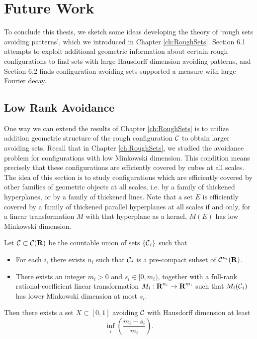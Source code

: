 
\chapter{Future Work}
\label{ch:Conclusions}

To conclude this thesis, we sketch some ideas developing the theory of `rough sets avoiding patterns', which we introduced in Chapter \ref{ch:RoughSets}. Section 6.1 attempts to exploit additional geometric information about certain rough configurations to find sets with large Hausdorff dimension avoiding patterns, and Section 6.2 finds configuration avoiding sets supported a measure with large Fourier decay.

\section{Low Rank Avoidance}

One way we can extend the results of Chapter \ref{ch:RoughSets} is to utilize addition geometric structure of the rough configuration $\operatorname{\mathcal{C}}$ to obtain larger avoiding sets. Recall that in Chapter \ref{ch:RoughSets}, we studied the avoidance problem for configurations with low Minkowski dimension. This condition means precisely that these configurations are efficiently covered by cubes at all scales. The idea of this section is to study configurations which are efficiently covered by other families of geometric objects at all scales, i.e. by a family of thickened hyperplanes, or by a family of thickened lines. Note that a set $E$ is efficiently covered by a family of thickened parallel hyperplanes at all scales if and only, for a linear transformation $M$ with that hyperplane as a kernel, $M(E)$ has low Minkowski dimension.

\begin{theorem} \label{theorem9063909014901}
    Let $\operatorname{\mathcal{C}} \subset \operatorname{\mathcal{C}}(\operatorname{\mathbf{R}})$ be the countable union of sets $\{ \operatorname{\mathcal{C}}_i \}$ such that
    \begin{itemize}
        \item For each $i$, there exists $n_i$ such that $\operatorname{\mathcal{C}}_i$ is a pre-compact subset of $\operatorname{\mathcal{C}}^{n_i}(\operatorname{\mathbf{R}})$.

        \item There exists an integer $m_i > 0$ and $s_i \in [0,m_i)$, together with a full-rank rational-coefficient linear transformation $M_i: \operatorname{\mathbf{R}}^{n_i} \to \operatorname{\mathbf{R}}^{m_i}$ such that $M_i(\operatorname{\mathcal{C}}_i)$ has lower Minkowski dimension at most $s_i$.
    \end{itemize}
    Then there exists a set $X \subset [0,1]$ avoiding $\operatorname{\mathcal{C}}$ with Hausdorff dimension at least
    \[ \inf_i \left( \frac{m_i - s_i}{m_i} \right). \]
\end{theorem}

